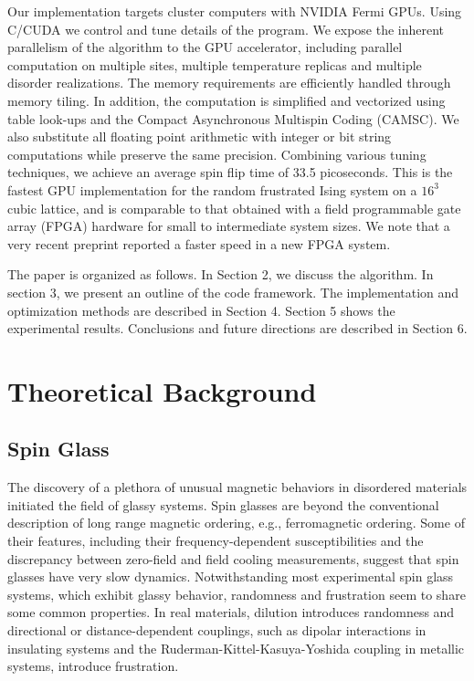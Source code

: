 Our implementation targets cluster computers with NVIDIA Fermi GPUs.
Using C/CUDA we control and tune details of the program.
We expose the inherent parallelism of the algorithm
to the GPU accelerator, including parallel computation on multiple sites, multiple temperature 
replicas and multiple disorder realizations. The memory requirements are efficiently handled through
memory tiling. In addition, the computation is simplified and
vectorized using table look-ups and the Compact Asynchronous
Multispin Coding (CAMSC). We also substitute all floating point arithmetic
with integer or bit string computations while preserve the same
precision. Combining various tuning techniques, we achieve an average
spin flip time of 33.5 picoseconds. This is the fastest GPU
implementation for the random frustrated Ising system on a $16^3$
cubic lattice, and is comparable to that obtained with a field
programmable gate array (FPGA) hardware \cite{Baity-Jesi2012} for
small to intermediate system sizes. We note that a very recent preprint reported a faster speed in
a new FPGA system\cite{TheJanusCollaboration:2012:JFS:2322156.2322158}. 

The paper is organized as follows. In Section 2, we discuss the algorithm. In section 3, 
we present an outline of the code framework. The implementation 
and optimization methods are described in Section 4. Section 5 shows the experimental  
results. Conclusions and future directions are described in Section 6. 



\section{Theoretical Background}


\subsection{Spin Glass}

The discovery of a plethora of unusual magnetic behaviors in disordered materials 
initiated the field of glassy systems.\cite{Binder-Young-1986} Spin glasses are 
beyond the conventional description of long range magnetic ordering, e.g., 
ferromagnetic ordering. Some of their features, including their frequency-dependent 
susceptibilities and the discrepancy between zero-field and field cooling measurements, 
suggest that spin glasses have very slow dynamics. Notwithstanding most experimental spin 
glass systems, which exhibit glassy behavior, randomness and frustration 
seem to share some common properties. In real materials, 
dilution introduces randomness and directional or distance-dependent couplings, 
such as dipolar interactions in insulating systems and the Ruderman-Kittel-Kasuya-Yoshida 
coupling in metallic systems, introduce frustration. 

